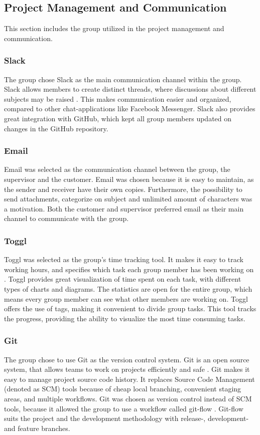 \subsection{Project Management and Communication}
This section includes the group utilized in the project management and communication.

\subsubsection{Slack}
The group chose Slack as the main communication channel within the group. Slack allows members to create distinct threads, where discussions about different subjects may be raised \cite{Slack}. This makes communication easier and organized, compared to other chat-applications like Facebook Messenger. Slack also provides great integration with GitHub, which kept all group members updated on changes in the GitHub repository. 

\subsubsection{Email}
Email was selected as the communication channel between the group, the supervisor and the customer.
Email was chosen because it is easy to maintain, as the sender and receiver have their own copies. Furthermore, the possibility to send attachments, categorize on subject and unlimited amount of characters was a motivation. Both the customer and supervisor preferred email as their main channel to communicate with the group.  

\subsubsection{Toggl}
Toggl was selected as the group's time tracking tool. It makes it easy to track working hours, and specifies which task each group member has been working on \cite{Toggl}. Toggl provides great visualization of time spent on each task, with different types of charts and diagrams. The statistics are open for the entire group, which means every group member can see what other members are working on. Toggl offers the use of tags, making it convenient to divide group tasks. This tool tracks the progress, providing the ability to visualize the most time consuming tasks.

\subsubsection{Git}
The group chose to use Git as the version control system. Git is an open source system, that allows teams to work on projects efficiently and safe \cite{Git}. Git makes it easy to manage project source code history. It replaces Source Code Management (denoted as SCM) tools because of cheap local branching, convenient staging areas, and multiple workflows. Git was chosen as version control instead of SCM tools, because it allowed the group to use a workflow called git-flow \cite{gitFlow}. Git-flow suits the project and the development methodology with release-, development- and feature branches. 

